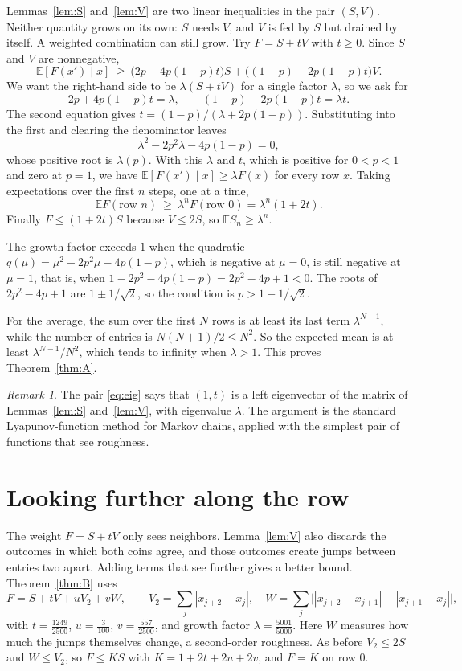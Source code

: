 \documentclass[11pt]{article}
\theoremstyle{remark}
\newtheorem*{remark}{Remark}
\newcommand{\E}{\mathbb{E}}
\begin{document}
Lemmas~\ref{lem:S} and~\ref{lem:V} are two linear inequalities in the pair $(S,V)$. Neither quantity grows on its own: $S$ needs $V$, and $V$ is fed by $S$ but drained by itself. A weighted combination can still grow. Try $F=S+tV$ with $t\ge0$. Since $S$ and $V$ are nonnegative,
\[
\E[F(x')\mid x]\ \ge\ \bigl(2p+4p(1-p)t\bigr)S+\bigl((1-p)-2p(1-p)t\bigr)V .
\]
We want the right-hand side to be $\lambda(S+tV)$ for a single factor $\lambda$, so we ask for
\begin{equation}\label{eq:eig}
2p+4p(1-p)t=\lambda,\qquad (1-p)-2p(1-p)t=\lambda t .
\end{equation}
The second equation gives $t=(1-p)/(\lambda+2p(1-p))$. Substituting into the first and clearing the denominator leaves
\[
\lambda^2-2p^2\lambda-4p(1-p)=0,
\]
whose positive root is $\lambda(p)$. With this $\lambda$ and $t$, which is positive for $0<p<1$ and zero at $p=1$, we have $\E[F(x')\mid x]\ge\lambda F(x)$ for every row $x$. Taking expectations over the first $n$ steps, one at a time,
\[
\E F(\text{row }n)\ \ge\ \lambda^n F(\text{row }0)=\lambda^n(1+2t).
\]
Finally $F\le(1+2t)S$ because $V\le2S$, so $\E S_n\ge\lambda^n$.

The growth factor exceeds $1$ when the quadratic $q(\mu)=\mu^2-2p^2\mu-4p(1-p)$, which is negative at $\mu=0$, is still negative at $\mu=1$, that is, when $1-2p^2-4p(1-p)=2p^2-4p+1<0$. The roots of $2p^2-4p+1$ are $1\pm1/\sqrt2$, so the condition is $p>1-1/\sqrt2$.

For the average, the sum over the first $N$ rows is at least its last term $\lambda^{N-1}$, while the number of entries is $N(N+1)/2\le N^2$. So the expected mean is at least $\lambda^{N-1}/N^2$, which tends to infinity when $\lambda>1$. This proves Theorem~\ref{thm:A}.

\begin{remark}
The pair \eqref{eq:eig} says that $(1,t)$ is a left eigenvector of the matrix of Lemmas~\ref{lem:S} and~\ref{lem:V}, with eigenvalue $\lambda$. The argument is the standard Lyapunov-function method for Markov chains, applied with the simplest pair of functions that see roughness.
\end{remark}

\section{Looking further along the row}\label{sec:B}

The weight $F=S+tV$ only sees neighbors. Lemma~\ref{lem:V} also discards the outcomes in which both coins agree, and those outcomes create jumps between entries two apart. Adding terms that see further gives a better bound. Theorem~\ref{thm:B} uses
\[
F=S+tV+uV_2+vW,\qquad V_2=\sum_j|x_{j+2}-x_j|,\quad W=\sum_j\bigl||x_{j+2}-x_{j+1}|-|x_{j+1}-x_j|\bigr|,
\]
with $t=\tfrac{1249}{2500}$, $u=\tfrac{3}{100}$, $v=\tfrac{557}{2500}$, and growth factor $\lambda=\tfrac{5001}{5000}$. Here $W$ measures how much the jumps themselves change, a second-order roughness. As before $V_2\le2S$ and $W\le V_2$, so $F\le KS$ with $K=1+2t+2u+2v$, and $F=K$ on row $0$.
\end{document}
